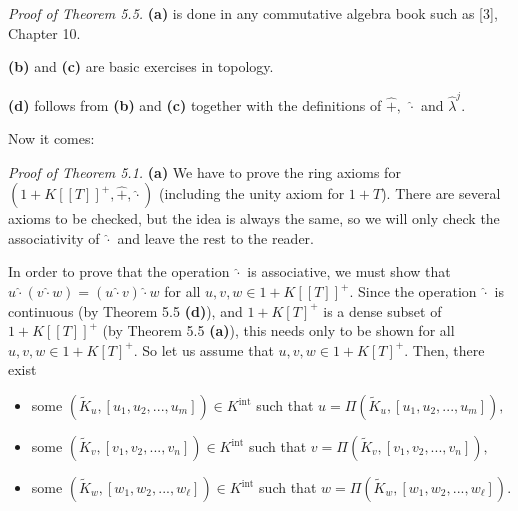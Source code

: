 \documentclass[12pt,final,notitlepage,onecolumn,german]{article}%
\begin{document}
\textit{Proof of Theorem 5.5.} \textbf{(a)} is done in any commutative algebra
book such as [3], Chapter 10.

\textbf{(b)} and \textbf{(c)} are basic exercises in topology.

\textbf{(d)} follows from \textbf{(b)} and \textbf{(c)} together with the
definitions of $\widehat{+},$ $\widehat{\cdot}$ and $\widehat{\lambda}^{j}$.

Now it comes:

\textit{Proof of Theorem 5.1.} \textbf{(a)} We have to prove the ring axioms
for $\left(  1+K\left[  \left[  T\right]  \right]  ^{+},\widehat{+}%
,\widehat{\cdot}\right)  $ (including the unity axiom for $1+T$). There are
several axioms to be checked, but the idea is always the same, so we will only
check the associativity of $\widehat{\cdot}$ and leave the rest to the reader.

In order to prove that the operation $\widehat{\cdot}$ is associative, we must
show that $u\widehat{\cdot}\left(  v\widehat{\cdot}w\right)  =\left(
u\widehat{\cdot}v\right)  \widehat{\cdot}w$ for all $u,v,w\in1+K\left[
\left[  T\right]  \right]  ^{+}$. Since the operation $\widehat{\cdot}$ is
continuous (by Theorem 5.5 \textbf{(d)}), and $1+K\left[  T\right]  ^{+}$ is a
dense subset of $1+K\left[  \left[  T\right]  \right]  ^{+}$ (by Theorem 5.5
\textbf{(a)}), this needs only to be shown for all $u,v,w\in1+K\left[
T\right]  ^{+}$. So let us assume that $u,v,w\in1+K\left[  T\right]  ^{+}$.
Then, there exist

\begin{itemize}
\item some $\left(  \widetilde{K}_{u},\left[  u_{1},u_{2},...,u_{m}\right]
\right)  \in K^{\operatorname*{int}}$ such that $u=\Pi\left(  \widetilde
{K}_{u},\left[  u_{1},u_{2},...,u_{m}\right]  \right)  ,$

\item some $\left(  \widetilde{K}_{v},\left[  v_{1},v_{2},...,v_{n}\right]
\right)  \in K^{\operatorname*{int}}$ such that $v=\Pi\left(  \widetilde
{K}_{v},\left[  v_{1},v_{2},...,v_{n}\right]  \right)  ,$

\item some $\left(  \widetilde{K}_{w},\left[  w_{1},w_{2},...,w_{\ell}\right]
\right)  \in K^{\operatorname*{int}}$ such that $w=\Pi\left(  \widetilde
{K}_{w},\left[  w_{1},w_{2},...,w_{\ell}\right]  \right)  $.
\end{itemize}
\end{document}
